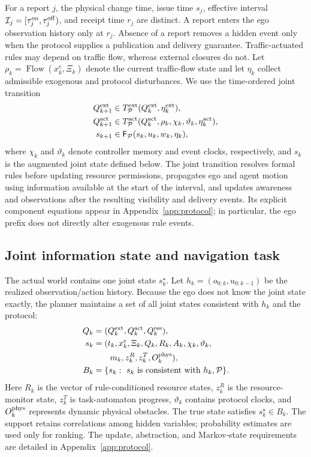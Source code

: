 \documentclass[letterpaper]{article} %
\begin{document}
For a report $j$, the physical change time, issue time $s_j$, effective interval $\mathcal I_j=[\tau_j^{\rm on},\tau_j^{\rm off})$, and receipt time $r_j$ are distinct. A report enters the ego observation history only at $r_j$. Absence of a report removes a hidden event only when the protocol supplies a publication and delivery guarantee. Traffic-actuated rules may depend on traffic flow, whereas external closures do not. Let $\rho_k=\operatorname{Flow}(x_k^e,\Xi_k)$ denote the current traffic-flow state and let $\eta_k$ collect admissible exogenous and protocol disturbances. We use the time-ordered joint transition
\begin{equation}
\begin{aligned}
Q_{k+1}^{\rm ext}&\in T_{\mathcal P}^{\rm ext}(Q_k^{\rm ext},\eta_k^{\rm ext}),\\
Q_{k+1}^{\rm act}&\in T_{\mathcal P}^{\rm act}(Q_k^{\rm act},\rho_k,\chi_k,\vartheta_k,\eta_k^{\rm act}),\\
s_{k+1}&\in\mathsf F_{\mathcal P}(s_k,u_k,w_k,\eta_k),
\end{aligned}
\label{eq:causal-transition}
\end{equation}
where $\chi_k$ and $\vartheta_k$ denote controller memory and event clocks, respectively, and $s_k$ is the augmented joint state defined below. The joint transition resolves formal rules before updating resource permissions, propagates ego and agent motion using information available at the start of the interval, and updates awareness and observations after the resulting visibility and delivery events. Its explicit component equations appear in Appendix~\ref{app:protocol}; in particular, the ego prefix does not directly alter exogenous rule events.

\subsection{Joint information state and navigation task}
The actual world contains one joint state $s_k^\star$. Let $h_k=(o_{0:k},u_{0:k-1})$ be the realized observation/action history. Because the ego does not know the joint state exactly, the planner maintains a set of all joint states consistent with $h_k$ and the protocol:
\begin{equation}
\begin{aligned}
Q_k&=(Q_k^{\rm ext},Q_k^{\rm act},Q_k^{\rm res}),\\
s_k&=(t_k,x_k^e,\Xi_k,Q_k,R_k,A_k,\chi_k,\vartheta_k,\\
&\qquad m_k,z_k^R,z_k^T,O_k^{\rm phys}),\\
B_k&=\{s_k:\ s_k\text{ is consistent with }h_k,\mathcal P\}.
\end{aligned}
\label{eq:joint-belief}
\end{equation}
Here $R_k$ is the vector of rule-conditioned resource states, $z_k^R$ is the resource-monitor state, $z_k^T$ is task-automaton progress, $\vartheta_k$ contains protocol clocks, and $O_k^{\rm phys}$ represents dynamic physical obstacles. The true state satisfies $s_k^\star\in B_k$. The support retains correlations among hidden variables; probability estimates are used only for ranking. The update, abstraction, and Markov-state requirements are detailed in Appendix~\ref{app:protocol}.
\end{document}
